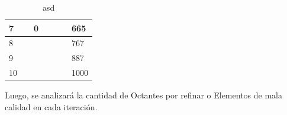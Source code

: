 \begin{table}[!ht]
\begin{tabular}{|lllllll|}
\multicolumn{1}{|l|}{7}                     & \multicolumn{1}{l|}{}                     & \multicolumn{1}{l|}{0}                       & \multicolumn{1}{l|}{}                   & \multicolumn{1}{l|}{}                   & \multicolumn{1}{l|}{}                     & 665               \\ \hline
\multicolumn{1}{|l|}{8}                     & \multicolumn{1}{l|}{}                     & \multicolumn{1}{l|}{}                        & \multicolumn{1}{l|}{}                   & \multicolumn{1}{l|}{}                   & \multicolumn{1}{l|}{}                     & 767               \\ \hline
\multicolumn{1}{|l|}{9}                     & \multicolumn{1}{l|}{}                     & \multicolumn{1}{l|}{}                        & \multicolumn{1}{l|}{}                   & \multicolumn{1}{l|}{}                   & \multicolumn{1}{l|}{}                     & 887               \\ \hline
\multicolumn{1}{|l|}{10}                    & \multicolumn{1}{l|}{}                     & \multicolumn{1}{l|}{}                        & \multicolumn{1}{l|}{}                   & \multicolumn{1}{l|}{}                   & \multicolumn{1}{l|}{}                     & 1000              \\ \hline
\end{tabular}
\caption{asd}
\label{table:num_octs_ref}
\end{table}


Luego, se analizará la cantidad de Octantes por refinar o Elementos de mala calidad en cada iteración.

